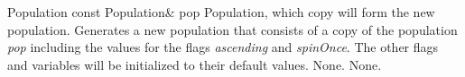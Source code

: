 \vspace*{4ex}

\setNormalInstance
\printMethodWithOneParam
{}
{Population}
{const Population\&}
{pop}
{Population, which copy will form the new population.}
{Generates a new population that consists of a copy of the population
 {\em pop} including the values for the flags {\em ascending} and 
 {\em spinOnce}. The other flags and variables will be initialized
 to their default values.}
{None.}
{None.}









